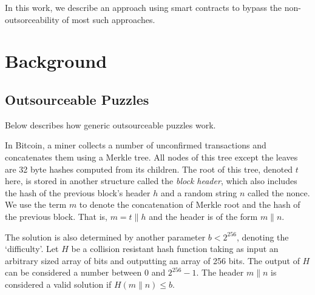 \documentclass[11pt]{article}
\newcommand{\authnote}[2]{\marginpar{\parbox{\marginparwidth}{\tiny %
  \textsf{#1 {\textcolor{blue}{notes: #2}}}}}%
  \textcolor{blue}{\textbf{\dag}}}
\newcommand{\authnote}[2]{
  \textsf{#1 \textcolor{blue}{: #2}}}
\newcommand{\authnote}[2]{}
\newcommand{\snote}[1]{{\authnote{\textcolor{yellow}{Scalahub notes}}{#1}}}
\newcommand{\langname}{ErgoScript\xspace}
\newcommand{\powname}{Autolykos\xspace}
\begin{document}
In this work, we describe an approach using smart contracts to bypass the non-outsorceability of most such approaches. 


\section{Background}
\subsection{Outsourceable Puzzles}

Below describes how generic outsourceable puzzles work. 

\snote{Following is more or less copy-pasted from PoW intro paper. Needs rework}


In Bitcoin, a miner collects a number of unconfirmed transactions and concatenates them using a Merkle tree. All nodes of this tree except the leaves are 32 byte hashes computed from its children. The root of this tree, denoted $t$ here, is stored in another structure called the {\em block header}, which also includes the hash of the previous block's header $h$ and a random string $n$ called the nonce. We use the term $m$ to denote the concatenation of Merkle root and the hash of the previous block. 
That is, $m = t\|h$ and the header is of the form $m\|n$. 

The solution is also determined by another parameter $b < 2^{256}$, denoting the `difficulty'. Let $H$ be a collision resistant hash function taking as input an arbitrary sized array of bits and outputting an array of 256 bits. The output of $H$ can be considered a number between 0 and $2^{256}-1$. The header $m\|n$ is considered a valid solution if $H(m\|n) \leq b$. 
\end{document}

